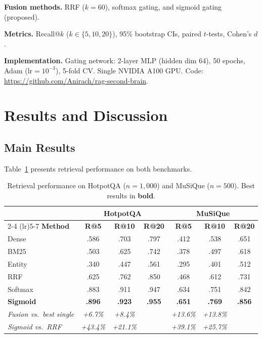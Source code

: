 \documentclass[preprint,12pt]{elsarticle}
\begin{document}
\textbf{Fusion methods.} RRF \citep{cormack2009rrf} ($k=60$), softmax gating, and sigmoid gating (proposed).

\textbf{Metrics.} Recall@$k$ ($k \in \{5, 10, 20\}$), 95\% bootstrap CIs, paired $t$-tests, Cohen's $d$.

\textbf{Implementation.} Gating network: 2-layer MLP (hidden dim 64), 50 epochs, Adam ($\text{lr}=10^{-3}$), 5-fold CV. Single NVIDIA A100 GPU. Code: \url{https://github.com/Anirach/rag-second-brain}.

\section{Results and Discussion}
\label{sec:results}

\subsection{Main Results}

Table~\ref{tab:main_results} presents retrieval performance on both benchmarks.

\begin{table}[t]
\centering
\caption{Retrieval performance on HotpotQA ($n=1{,}000$) and MuSiQue ($n=500$). Best results in \textbf{bold}.}
\label{tab:main_results}
\begin{tabular}{lcccccc}
\toprule
 & \multicolumn{3}{c}{\textbf{HotpotQA}} & \multicolumn{3}{c}{\textbf{MuSiQue}} \\
\cmidrule(lr){2-4} \cmidrule(lr){5-7}
\textbf{Method} & \textbf{R@5} & \textbf{R@10} & \textbf{R@20} & \textbf{R@5} & \textbf{R@10} & \textbf{R@20} \\
\midrule
Dense & .586 & .703 & .797 & .412 & .538 & .651 \\
BM25 & .503 & .625 & .742 & .378 & .497 & .618 \\
Entity & .340 & .447 & .561 & .295 & .401 & .512 \\
\midrule
RRF & .625 & .762 & .850 & .468 & .612 & .731 \\
Softmax & .883 & .911 & .947 & .634 & .751 & .842 \\
\textbf{Sigmoid} & \textbf{.896} & \textbf{.923} & \textbf{.955} & \textbf{.651} & \textbf{.769} & \textbf{.856} \\
\midrule
\textit{Fusion vs.\ best single} & \textit{+6.7\%} & \textit{+8.4\%} & & \textit{+13.6\%} & \textit{+13.8\%} & \\
\textit{Sigmoid vs.\ RRF} & \textit{+43.4\%} & \textit{+21.1\%} & & \textit{+39.1\%} & \textit{+25.7\%} & \\
\bottomrule
\end{tabular}
\end{table}
\end{document}
